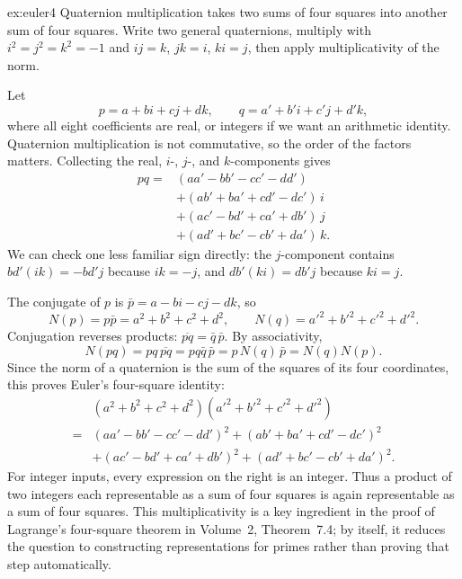 \begin{solution}{ex:euler4}
\idea Quaternion multiplication takes two sums of four squares into another sum of four squares. Write two general quaternions, multiply with $i^2=j^2=k^2=-1$ and $ij=k$, $jk=i$, $ki=j$, then apply multiplicativity of the norm.

\writeup Let
\[
p=a+bi+cj+dk,\qquad
q=a'+b'i+c'j+d'k,
\]
where all eight coefficients are real, or integers if we want an arithmetic identity. Quaternion multiplication is not commutative, so the order of the factors matters. Collecting the real, $i$-, $j$-, and $k$-components gives
\[
\begin{aligned}
pq={}&(aa'-bb'-cc'-dd')\\
&+(ab'+ba'+cd'-dc')\,i\\
&+(ac'-bd'+ca'+db')\,j\\
&+(ad'+bc'-cb'+da')\,k.
\end{aligned}
\]
We can check one less familiar sign directly: the $j$-component contains $bd'(ik)=-bd'j$ because $ik=-j$, and $db'(ki)=db'j$ because $ki=j$.

The conjugate of $p$ is $\bar p=a-bi-cj-dk$, so
\[
N(p)=p\bar p=a^2+b^2+c^2+d^2,
\qquad
N(q)=a'^2+b'^2+c'^2+d'^2.
\]
Conjugation reverses products: $\overline{pq}=\bar q\,\bar p$. By associativity,
\[
N(pq)=pq\,\overline{pq}
=pq\bar q\,\bar p=p\,N(q)\,\bar p
=N(q)N(p).
\]
Since the norm of a quaternion is the sum of the squares of its four coordinates, this proves Euler's four-square identity:
\[
\begin{aligned}
&(a^2+b^2+c^2+d^2)(a'^2+b'^2+c'^2+d'^2)\\
={}&(aa'-bb'-cc'-dd')^2
+(ab'+ba'+cd'-dc')^2\\
&+(ac'-bd'+ca'+db')^2
+(ad'+bc'-cb'+da')^2.
\end{aligned}
\]
For integer inputs, every expression on the right is an integer. Thus a product of two integers each representable as a sum of four squares is again representable as a sum of four squares. This multiplicativity is a key ingredient in the proof of Lagrange's four-square theorem in Volume~2, Theorem~7.4; by itself, it reduces the question to constructing representations for primes rather than proving that step automatically.
\end{solution}

